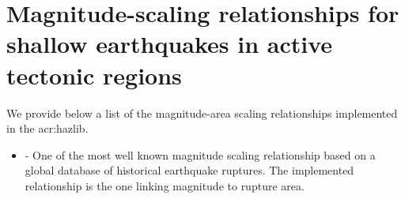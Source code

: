 \label{sec:msr_list}

\section[Relationships for shallow earthquakes in active tectonic regions]{Magnitude-scaling relationships for shallow earthquakes in active tectonic regions}
We provide below a list of the magnitude-area scaling relationships 
implemented in the \gls{acr:hazlib}.
\begin{itemize}
    \item \cite{wells1994} - One of the most well known magnitude scaling
        relationship based on a global database of historical earthquake 
        ruptures. The implemented relationship is the one linking magnitude 
        to rupture area.
\end{itemize}
%
%

